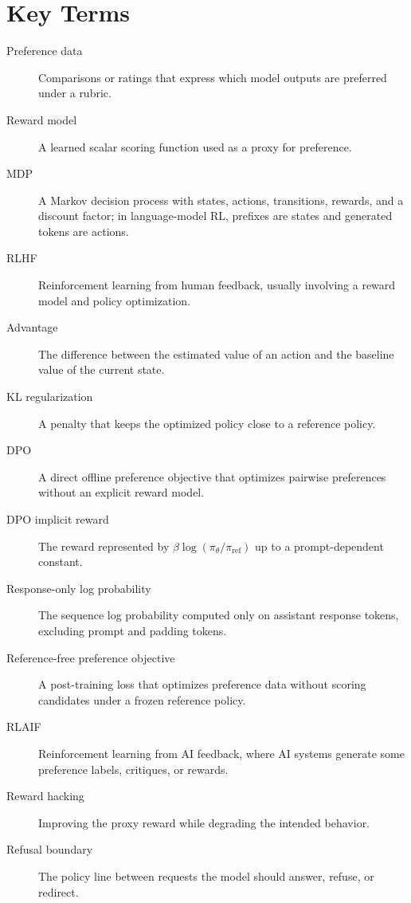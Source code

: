 \section{Key Terms}
\begin{description}
    \item[Preference data] Comparisons or ratings that express which model outputs are preferred under a rubric.
    \item[Reward model] A learned scalar scoring function used as a proxy for preference.
    \item[MDP] A Markov decision process with states, actions, transitions, rewards, and a discount factor; in language-model RL, prefixes are states and generated tokens are actions.
    \item[RLHF] Reinforcement learning from human feedback, usually involving a reward model and policy optimization.
    \item[Advantage] The difference between the estimated value of an action and the baseline value of the current state.
    \item[KL regularization] A penalty that keeps the optimized policy close to a reference policy.
    \item[DPO] A direct offline preference objective that optimizes pairwise preferences without an explicit reward model.
    \item[DPO implicit reward] The reward represented by $\beta\log(\pi_\theta/\pi_{\mathrm{ref}})$ up to a prompt-dependent constant.
    \item[Response-only log probability] The sequence log probability computed only on assistant response tokens, excluding prompt and padding tokens.
    \item[Reference-free preference objective] A post-training loss that optimizes preference data without scoring candidates under a frozen reference policy.
    \item[RLAIF] Reinforcement learning from AI feedback, where AI systems generate some preference labels, critiques, or rewards.
    \item[Reward hacking] Improving the proxy reward while degrading the intended behavior.
    \item[Refusal boundary] The policy line between requests the model should answer, refuse, or redirect.
\end{description}

